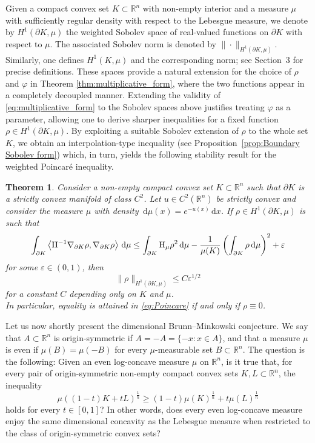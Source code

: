 \documentclass[a4paper, 11pt]{article}
\newcommand{\R}{\mathbb{R}}
\newtheorem{theorem}{Theorem}[section]
\theoremstyle{definition}
\newcommand{\di}{\, \mathrm{d}}
\begin{document}
\medskip

Given a compact convex set $K\subset\R^n$ with non-empty interior and a measure $\mu$ with sufficiently regular density with respect to the Lebesgue measure, we denote by $H^1(\partial K,\mu)$ the weighted Sobolev space of real-valued functions on $\partial K$ with respect to $\mu$. The associated Sobolev norm is denoted by $\|\cdot\|_{H^1(\partial K,\mu)}$. Similarly, one defines $H^1(K,\mu)$ and the corresponding norm; see Section~3 for precise definitions. These spaces provide a natural extension for the choice of $\rho$ and $\varphi$ in Theorem \ref{thm:multiplicative_form}, where the two functions appear in a completely decoupled manner. Extending the validity of \eqref{eq:multiplicative_form} to the Sobolev spaces above justifies treating $\varphi$ as a parameter, allowing one to derive sharper inequalities for a fixed function $\rho\in H^1(\partial K,\mu)$. By exploiting a suitable Sobolev extension of $\rho$ to the whole set $K$, we obtain an interpolation-type inequality (see Proposition~\ref{prop:Boundary Sobolev form}) which, in turn, yields the following stability result for the weighted Poincar\'e inequality. 
\begin{theorem}\label{thm:stability_intro}
    Consider a non-empty compact convex set $K \subset \R^n$ such that $\partial K$ is a strictly convex manifold of class $C^2$. Let $u \in C^2(\R^n)$ be strictly convex and consider the measure $\mu$ with density $\di \mu(x) = e^{-u(x)}\di x$. If $\rho \in H^1(\partial K,\mu)$ is such that 
\begin{equation}\label{eq:stability_intro}
\int_{\partial K} \left\langle {\rm{II}}^{-1}\nabla_{\partial K}\rho, \nabla_{\partial K} \rho \right\rangle \di \mu \leq \int_{\partial K}\mathrm{H}_{\mu}\rho^2\di \mu  -\frac{1}{\mu(K)}\left( \int_{\partial K}\rho \di \mu  \right)^2 + \varepsilon
\end{equation}
for some $\varepsilon \in (0,1)$, then
\[\|\rho\|_{H^{1}(\partial K,\mu)} \leq C\varepsilon^{1/2}\]
for a constant $C$ depending only on $K$ and $\mu$.\\
In particular, equality is attained in \eqref{eq:Poincare} if and only if $\rho \equiv 0$.
\end{theorem}

\medskip

Let us now shortly present the dimensional Brunn--Minkowski conjecture. We say that $A \subset \R^n$ is origin-symmetric if $A=-A=\{-x \colon x \in A \}$, and that a measure $\mu$ is even if $\mu(B)=\mu(-B)$ for every $\mu$-measurable set $B \subset \R^n$. The question is the following: Given an even log-concave measure $\mu$ on $\R^n$, is it true that, for every pair of origin-symmetric non-empty compact convex sets $K,L \subset \R^n$, the inequality 
\begin{equation}\label{eq:dim_BM}
    \mu((1-t)K+tL)^{\frac{1}{n}}\geq (1-t)\mu(K)^{\frac{1}{n}}+t\mu(L)^{\frac{1}{n}}
\end{equation}
holds for every $t \in [0,1]$? In other words, does every even log-concave measure enjoy the same dimensional concavity as the Lebesgue measure when restricted to the class of origin-symmetric convex sets?
\end{document}
